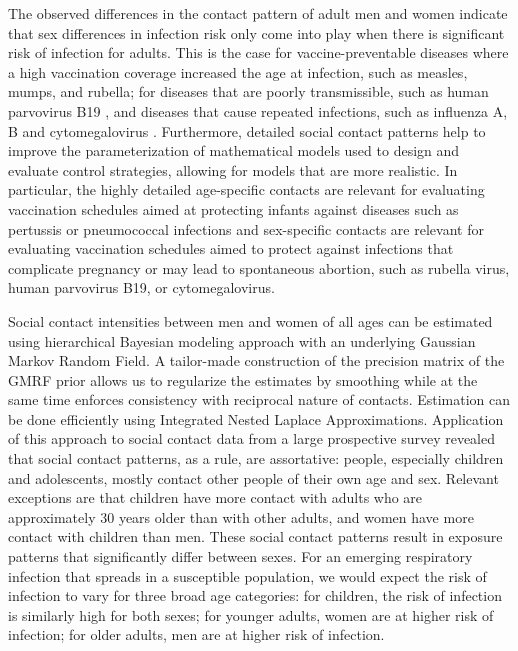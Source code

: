 \documentclass[aoas,preprint]{imsart}
\numberwithin{equation}{section}
\begin{document}
The observed differences in the contact pattern of adult men and women indicate that sex differences in infection risk only come into play when there is significant risk of infection for adults. This is the case for vaccine-preventable diseases where a high vaccination coverage increased the age at infection, such as measles, mumps, and rubella; for diseases that are poorly transmissible, such as human parvovirus B19 \citep{young_parvovirus_2004}, and diseases that cause repeated infections, such as influenza A, B \citep{klein_impact_2010} and cytomegalovirus \citep{pass_vaccine_2009}. Furthermore, detailed social contact patterns help to improve the parameterization of mathematical models used to design and evaluate control strategies, allowing for models that are more realistic. In particular, the highly detailed age-specific contacts are relevant for evaluating vaccination schedules aimed at protecting infants against diseases such as pertussis or pneumococcal infections and sex-specific contacts are relevant for evaluating vaccination schedules aimed to protect against infections that complicate pregnancy or may lead to spontaneous abortion, such as rubella virus, human parvovirus B19, or cytomegalovirus.

Social contact intensities between men and women of all ages can be estimated using hierarchical Bayesian modeling approach with an underlying Gaussian Markov Random Field. A tailor-made construction of the precision matrix of the GMRF prior allows us to regularize the estimates by smoothing while at the same time enforces consistency with reciprocal nature of contacts. Estimation can be done efficiently using Integrated Nested Laplace Approximations. Application of this approach to social contact data from a large prospective survey revealed that social contact patterns, as a rule, are assortative: people, especially children and adolescents, mostly contact other people of their own age and sex. Relevant exceptions are that children have more contact with adults who are approximately 30 years older than with other adults, and women have more contact with children than men. These social contact patterns result in exposure patterns that significantly differ between sexes. For an emerging respiratory infection that spreads in a susceptible population, we would expect the risk of infection to vary for three broad age categories: for children, the risk of infection is similarly high for both sexes; for younger adults, women are at higher risk of infection; for older adults, men are at higher risk of infection.
\end{document}
